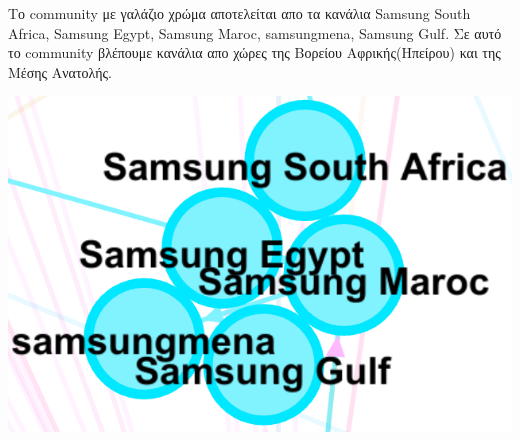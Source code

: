 \documentclass[12pt]{article}
\begin{document}
	\vspace{12pt}
	\vspace{12pt}
	\vspace{12pt}
	\begin{minipage}{0.6\textwidth}
		Το community με γαλάζιο χρώμα αποτελείται απο τα κανάλια Samsung South Africa, Samsung Egypt, Samsung Maroc, samsungmena, Samsung Gulf. Σε αυτό το community βλέπουμε κανάλια απο χώρες της Βορείου Αφρικής(Ηπείρου) και της Μέσης Ανατολής.
	\end{minipage}
	\hspace{0.05\textwidth}
	\begin{minipage}{0.3\textwidth}
		\includegraphics[width=1.0\textwidth]{photos-files/section12/0.1/vorioAfriki_middleEast.png}
	\end{minipage}
	
\end{document}
